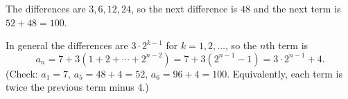 The differences are $3,6,12,24$, so the next difference is $48$ and the next term is $52+48=\boxed{100}$.

In general the differences are $3\cdot2^{k-1}$ for $k=1,2,\dots$, so the $n$th term is
\[a_n=7+3\left(1+2+\cdots+2^{n-2}\right)=7+3\left(2^{n-1}-1\right)=\boxed{3\cdot2^{n-1}+4}.\]
(Check: $a_1=7$, $a_5=48+4=52$, $a_6=96+4=100$. Equivalently, each term is twice the previous term minus $4$.)
